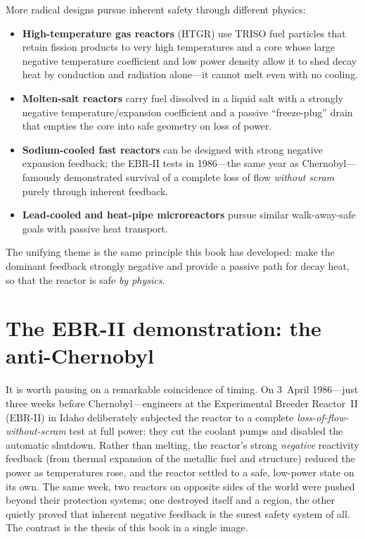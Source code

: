 More radical designs pursue inherent safety through different physics:
\begin{itemize}[nosep]
\item \textbf{High-temperature gas reactors} (HTGR) use TRISO fuel particles that
retain fission products to very high temperatures and a core whose large negative
temperature coefficient and low power density allow it to shed decay heat by
conduction and radiation alone---it cannot melt even with no cooling.
\item \textbf{Molten-salt reactors} carry fuel dissolved in a liquid salt with a
strongly negative temperature/expansion coefficient and a passive
``freeze-plug'' drain that empties the core into safe geometry on loss of power.
\item \textbf{Sodium-cooled fast reactors} can be designed with strong negative
expansion feedback; the EBR-II tests in 1986---the same year as Chernobyl---famously
demonstrated survival of a complete loss of flow \emph{without scram} purely
through inherent feedback.
\item \textbf{Lead-cooled and heat-pipe microreactors} pursue similar
walk-away-safe goals with passive heat transport.
\end{itemize}
The unifying theme is the same principle this book has developed: make the
dominant feedback strongly negative and provide a passive path for decay heat, so
that the reactor is safe \emph{by physics}.

\section{The EBR-II demonstration: the anti-Chernobyl}

It is worth pausing on a remarkable coincidence of timing. On 3~April 1986---just
three weeks before Chernobyl---engineers at the Experimental Breeder Reactor~II
(EBR-II) in Idaho deliberately subjected the reactor to a complete
\emph{loss-of-flow-without-scram} test at full power: they cut the coolant pumps
and disabled the automatic shutdown. Rather than melting, the reactor's strong
\emph{negative} reactivity feedback (from thermal expansion of the metallic fuel
and structure) reduced the power as temperatures rose, and the reactor settled to a
safe, low-power state on its own. The same week, two reactors on opposite sides of
the world were pushed beyond their protection systems; one destroyed itself and a
region, the other quietly proved that inherent negative feedback is the surest
safety system of all. The contrast is the thesis of this book in a single image.

